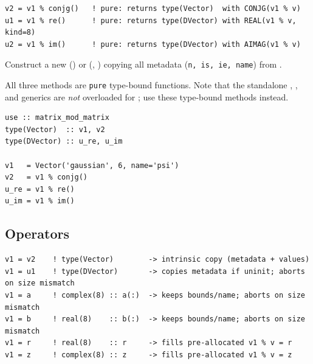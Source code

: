 \lstset{language=[95]Fortran}
\begin{lstlisting}
v2 = v1 % conjg()   ! pure: returns type(Vector)  with CONJG(v1 % v)
u1 = v1 % re()      ! pure: returns type(DVector) with REAL(v1 % v, kind=8)
u2 = v1 % im()      ! pure: returns type(DVector) with AIMAG(v1 % v)
\end{lstlisting}

Construct a new  () or  (, ) copying all metadata (\texttt{n, is, ie, name}) from .

All three methods are \texttt{pure} type-bound functions. Note that the standalone , , and  generics are \emph{not} overloaded for ; use these type-bound methods instead.

\begin{description}[leftmargin=2.2cm, style=nextline]
\end{description}

\lstset{language=[95]Fortran}
\begin{lstlisting}
use :: matrix_mod_matrix
type(Vector)  :: v1, v2
type(DVector) :: u_re, u_im

v1   = Vector('gaussian', 6, name='psi')
v2   = v1 % conjg()
u_re = v1 % re()
u_im = v1 % im()
\end{lstlisting}

\subsection{Operators}
\label{subsec:vec_operators}



\lstset{language=[95]Fortran}
\begin{lstlisting}
v1 = v2    ! type(Vector)        -> intrinsic copy (metadata + values)
v1 = u1    ! type(DVector)       -> copies metadata if uninit; aborts on size mismatch
v1 = a     ! complex(8) :: a(:)  -> keeps bounds/name; aborts on size mismatch
v1 = b     ! real(8)    :: b(:)  -> keeps bounds/name; aborts on size mismatch
v1 = r     ! real(8)    :: r     -> fills pre-allocated v1 % v = r
v1 = z     ! complex(8) :: z     -> fills pre-allocated v1 % v = z
\end{lstlisting}

